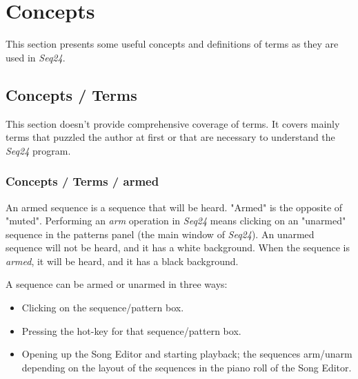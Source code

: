 %
%
%

\section{Concepts}
\label{sec:concepts}

   This section presents some useful concepts and definitions of terms as
   they are used in \textsl{Seq24}.

\subsection{Concepts / Terms}
\label{subsec:concepts_terms}

   This section doesn't provide comprehensive coverage of terms.  It
   covers mainly terms that puzzled the author at first or that are
   necessary to understand the \textsl{Seq24} program.

\subsubsection{Concepts / Terms / armed}
\label{subsubsec:concepts_terms_armed}

   An armed sequence is a sequence that will be heard.
   "Armed" is the opposite of "muted".
   Performing an \textsl{arm} operation in \textsl{Seq24} means clicking on
   an "unarmed" sequence in the patterns panel (the main window of
   \textsl{Seq24}).  An unarmed sequence will not be heard, and it
   has a white background.  When the sequence is \textsl{armed},
   it will be heard, and it has a black background.

   A sequence can be armed or unarmed in three ways:

   \begin{itemize}
      \item Clicking on the sequence/pattern box.
      \item Pressing the hot-key for that sequence/pattern box.
      \item Opening up the Song Editor and starting playback; the
            sequences arm/unarm depending on the layout of the
            sequences in the piano roll of the Song Editor.
   \end{itemize}

